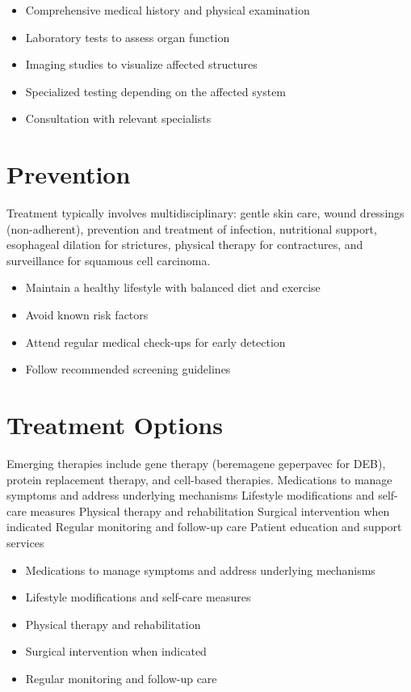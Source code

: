 \begin{itemize}[noitemsep]
  \item Comprehensive medical history and physical examination
  \item Laboratory tests to assess organ function
  \item Imaging studies to visualize affected structures
  \item Specialized testing depending on the affected system
  \item Consultation with relevant specialists
\end{itemize}
\section{Prevention}
Treatment typically involves multidisciplinary: gentle skin care, wound dressings (non-adherent), prevention and treatment of infection, nutritional support, esophageal dilation for strictures, physical therapy for contractures, and surveillance for squamous cell carcinoma.

\begin{itemize}[noitemsep]
  \item Maintain a healthy lifestyle with balanced diet and exercise
  \item Avoid known risk factors
  \item Attend regular medical check-ups for early detection
  \item Follow recommended screening guidelines
\end{itemize}
\section{Treatment Options}
Emerging therapies include gene therapy (beremagene geperpavec for DEB), protein replacement therapy, and cell-based therapies. Medications to manage symptoms and address underlying mechanisms Lifestyle modifications and self-care measures Physical therapy and rehabilitation Surgical intervention when indicated Regular monitoring and follow-up care Patient education and support services

\begin{itemize}[noitemsep]
  \item Medications to manage symptoms and address underlying mechanisms
  \item Lifestyle modifications and self-care measures
  \item Physical therapy and rehabilitation
  \item Surgical intervention when indicated
  \item Regular monitoring and follow-up care
\end{itemize}
